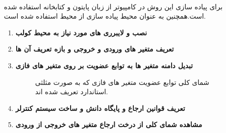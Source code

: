 \documentclass[12pt]{article}
\begin{document}
\paragraph{}
برای پیاده سازی این روش در کامپیوتر از زبان پایتون و کتابخانه  استفاده شده است.همچنین به عنوان محیط پیاده سازی از محیط  استفاده شده است.
\begin{enumerate}
    \item {
          \textbf{نصب و  لایبرری های مورد نیاز به محیط کولب}
          }
          \begin{figure}[H]
              \centering
              \begin{center}
              \end{center}
              \caption{}
          \end{figure}
    \item {
          \textbf{تعریف متغیر های ورودی و خروجی و بازه تعریف آن ها}
          }
          \begin{figure}[H]
              \centering
              \begin{center}
              \end{center}
              \caption{}
          \end{figure}
    \item {
          \textbf{تبدیل دامنه متغیر ها به توابع عضویت بر روی متغیر های فازی}
          }
          \begin{figure}[H]
              \centering
              \begin{center}
              \end{center}
              \caption{شمای کلی  توابع عضویت متغیر های فازی که به صورت مثلثی استاندارد تعریف شده اند.}
          \end{figure}
    \item {
          \textbf{تعریف قوانین ارجاع و پایگاه دانش و ساخت سیستم کنترلر}
          }
          \begin{figure}[H]
              \centering
              \begin{center}
              \end{center}
              \caption{}
          \end{figure}
    \item {
          \textbf{مشاهده شمای کلی از درخت ارجاع متغیر های خروجی از ورودی}
          }
          \begin{figure}[H]
              \centering
              \begin{center}
              \end{center}
              \caption{}
          \end{figure}


\end{enumerate}
\end{document}

